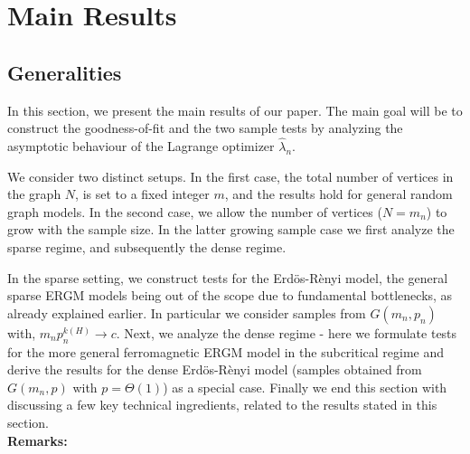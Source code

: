 \documentclass[12pt]{article}
\def\er{ Erd{\"o}s-R{\`e}nyi }
\numberwithin{equation}{section}
\begin{document}
\section{Main Results \label{main_res}}

\subsection{ Generalities}
In this section, we present the main results of our paper.  The main goal will be to construct the goodness-of-fit and the two sample tests by analyzing the asymptotic behaviour of the Lagrange optimizer $\hat{\lambda}_n$. 

We consider two distinct setups. In the first case, the total number of vertices in the graph $N$, is set to a fixed integer  
$m$, and the results hold for general random graph models. In the second case, we allow the number of vertices ($N=m_n$) to grow with the sample size. In the latter growing sample case we first analyze the sparse regime, and subsequently the dense regime. 

In the sparse setting, we construct tests for the \er model, the general sparse ERGM models being out of the scope due to fundamental bottlenecks, as already explained earlier. In particular we consider samples from $G(m_n,p_n)$ with, $m_np_n^{k(H)}\rightarrow c$.
Next, we analyze the dense regime - here we formulate tests for the more general ferromagnetic ERGM model in the subcritical regime and derive the results for the dense \er model (samples obtained from $G(m_n,p)$ with $p=\Theta(1)$) as a special case. Finally we end this section with discussing a few key technical ingredients, related to the results stated in this section.\\

\textbf{Remarks:}
\end{document}
